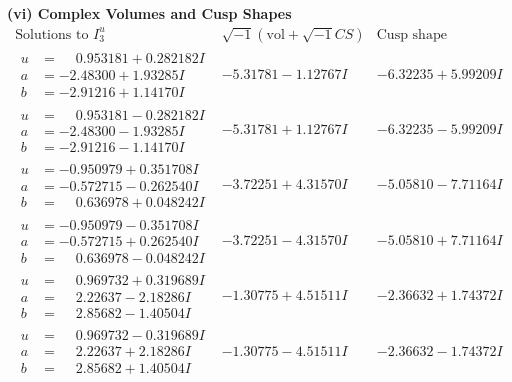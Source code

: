 \documentclass[1p]{elsarticle_modified}
\theoremstyle{definition}
\newcommand{\I}{\sqrt{-1}}
\begin{document}
\newpage\flushleft \textbf{(vi) Complex Volumes and Cusp Shapes}
$$\begin{array}{c|c|c}  
\text{Solutions to }I^u_{3}& \I (\text{vol} + \sqrt{-1}CS) & \text{Cusp shape}\\
 \hline 
\begin{aligned}
u &= \phantom{-}0.953181 + 0.282182 I \\
a &= -2.48300 + 1.93285 I \\
b &= -2.91216 + 1.14170 I\end{aligned}
 & -5.31781 - 1.12767 I & -6.32235 + 5.99209 I \\ \hline\begin{aligned}
u &= \phantom{-}0.953181 - 0.282182 I \\
a &= -2.48300 - 1.93285 I \\
b &= -2.91216 - 1.14170 I\end{aligned}
 & -5.31781 + 1.12767 I & -6.32235 - 5.99209 I \\ \hline\begin{aligned}
u &= -0.950979 + 0.351708 I \\
a &= -0.572715 - 0.262540 I \\
b &= \phantom{-}0.636978 + 0.048242 I\end{aligned}
 & -3.72251 + 4.31570 I & -5.05810 - 7.71164 I \\ \hline\begin{aligned}
u &= -0.950979 - 0.351708 I \\
a &= -0.572715 + 0.262540 I \\
b &= \phantom{-}0.636978 - 0.048242 I\end{aligned}
 & -3.72251 - 4.31570 I & -5.05810 + 7.71164 I \\ \hline\begin{aligned}
u &= \phantom{-}0.969732 + 0.319689 I \\
a &= \phantom{-}2.22637 - 2.18286 I \\
b &= \phantom{-}2.85682 - 1.40504 I\end{aligned}
 & -1.30775 + 4.51511 I & -2.36632 + 1.74372 I \\ \hline\begin{aligned}
u &= \phantom{-}0.969732 - 0.319689 I \\
a &= \phantom{-}2.22637 + 2.18286 I \\
b &= \phantom{-}2.85682 + 1.40504 I\end{aligned}
 & -1.30775 - 4.51511 I & -2.36632 - 1.74372 I \\ \hline\begin{aligned}

\end{aligned}
\end{array}$$
\end{document}
